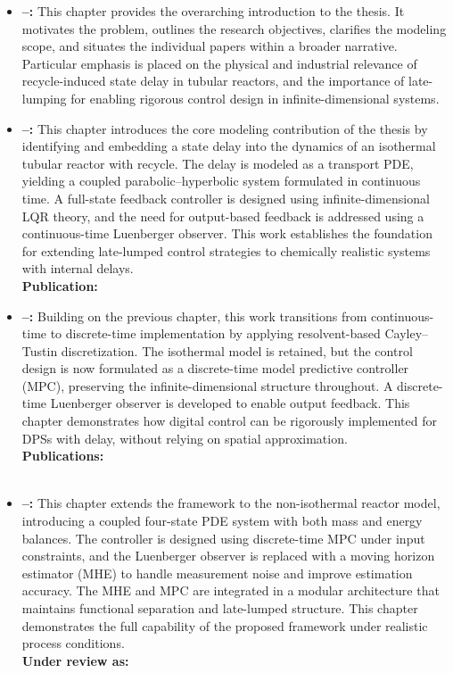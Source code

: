 \begin{itemize}
    \item \textbf{--:} This chapter provides the overarching introduction to the thesis. It motivates the problem, outlines the research objectives, clarifies the modeling scope, and situates the individual papers within a broader narrative. Particular emphasis is placed on the physical and industrial relevance of recycle-induced state delay in tubular reactors, and the importance of late-lumping for enabling rigorous control design in infinite-dimensional systems.

    \item \textbf{--:} This chapter introduces the core modeling contribution of the thesis by identifying and embedding a state delay into the dynamics of an isothermal tubular reactor with recycle. The delay is modeled as a transport PDE, yielding a coupled parabolic–hyperbolic system formulated in continuous time. A full-state feedback controller is designed using infinite-dimensional LQR theory, and the need for output-based feedback is addressed using a continuous-time Luenberger observer. This work establishes the foundation for extending late-lumped control strategies to chemically realistic systems with internal delays.\\
    \textbf{Publication:} 

    \item \textbf{--:} Building on the previous chapter, this work transitions from continuous-time to discrete-time implementation by applying resolvent-based Cayley–Tustin discretization. The isothermal model is retained, but the control design is now formulated as a discrete-time model predictive controller (MPC), preserving the infinite-dimensional structure throughout. A discrete-time Luenberger observer is developed to enable output feedback. This chapter demonstrates how digital control can be rigorously implemented for DPSs with delay, without relying on spatial approximation.\\
    \textbf{Publications:} \\
	\\

    \item \textbf{--:} This chapter extends the framework to the non-isothermal reactor model, introducing a coupled four-state PDE system with both mass and energy balances. The controller is designed using discrete-time MPC under input constraints, and the Luenberger observer is replaced with a moving horizon estimator (MHE) to handle measurement noise and improve estimation accuracy. The MHE and MPC are integrated in a modular architecture that maintains functional separation and late-lumped structure. This chapter demonstrates the full capability of the proposed framework under realistic process conditions.\\
    \textbf{Under review as:} 


\end{itemize}
